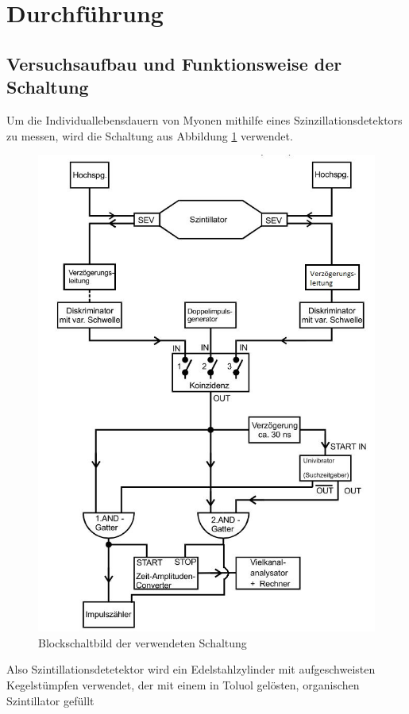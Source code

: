 \section{Durchführung}
\label{sec:Durchführung}
\subsection{Versuchsaufbau und Funktionsweise der Schaltung}
\label{sub:aufbau}
Um die Individuallebensdauern von Myonen mithilfe eines Szinzillationsdetektors zu messen, wird die Schaltung aus Abbildung \ref{fig:schaltung} verwendet.
\begin{figure}[H]
  \centering
  \includegraphics{blockschaltbild.JPG}
  \caption{Blockschaltbild der verwendeten Schaltung}
  \label{fig:schaltung}
\end{figure}
Also Szintillationsdetetektor wird ein Edelstahlzylinder mit aufgeschweisten Kegelstümpfen verwendet, der mit einem in Toluol gelösten, organischen Szintillator gefüllt
